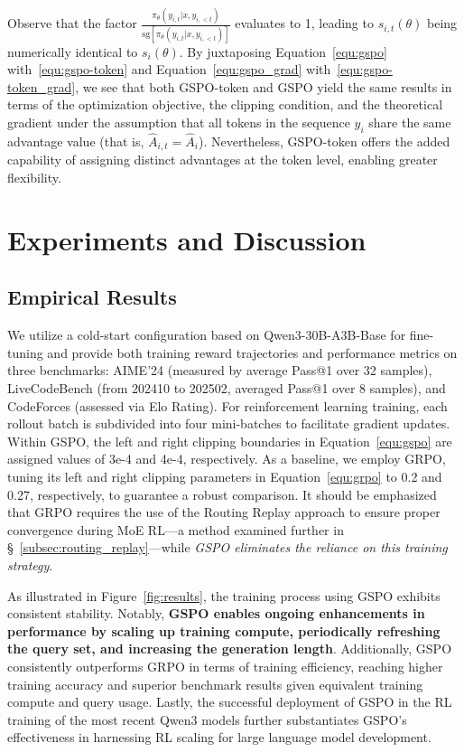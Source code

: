 Observe that the factor $\frac{ \pi_{\theta} (y_{i,t} | x, y_{i,<t}) }{ \mathrm{sg} \left[ \pi_{\theta} (y_{i,t} | x, y_{i,<t}) \right] }$ evaluates to 1, leading to $s_{i,t}(\theta)$ being numerically identical to $s_{i}(\theta)$. By juxtaposing Equation~\eqref{equ:gspo} with~\eqref{equ:gspo-token} and Equation~\eqref{equ:gspo_grad} with~\eqref{equ:gspo-token_grad}, we see that both GSPO-token and GSPO yield the same results in terms of the optimization objective, the clipping condition, and the theoretical gradient under the assumption that all tokens in the sequence $y_i$ share the same advantage value (that is, $\widehat{A}_{i,t} = \widehat{A}_{i}$). Nevertheless, GSPO-token offers the added capability of assigning distinct advantages at the token level, enabling greater flexibility.

\section{Experiments and Discussion}

\subsection{Empirical Results}

We utilize a cold-start configuration based on Qwen3-30B-A3B-Base for fine-tuning and provide both training reward trajectories and performance metrics on three benchmarks: AIME'24 (measured by average Pass@1 over 32 samples), LiveCodeBench (from 202410 to 202502, averaged Pass@1 over 8 samples), and CodeForces (assessed via Elo Rating). For reinforcement learning training, each rollout batch is subdivided into four mini-batches to facilitate gradient updates. Within GSPO, the left and right clipping boundaries in Equation~\eqref{equ:gspo} are assigned values of 3e-4 and 4e-4, respectively. As a baseline, we employ GRPO, tuning its left and right clipping parameters in Equation~\eqref{equ:grpo} to 0.2 and 0.27, respectively, to guarantee a robust comparison. It should be emphasized that GRPO requires the use of the Routing Replay approach to ensure proper convergence during MoE RL—a method examined further in \S~\ref{subsec:routing_replay}—while \textit{GSPO eliminates the reliance on this training strategy}.

As illustrated in Figure~\ref{fig:results}, the training process using GSPO exhibits consistent stability. Notably, \textbf{GSPO enables ongoing enhancements in performance by scaling up training compute, periodically refreshing the query set, and increasing the generation length}. Additionally, GSPO consistently outperforms GRPO in terms of training efficiency, reaching higher training accuracy and superior benchmark results given equivalent training compute and query usage. Lastly, the successful deployment of GSPO in the RL training of the most recent Qwen3 models further substantiates GSPO’s effectiveness in harnessing RL scaling for large language model development.

